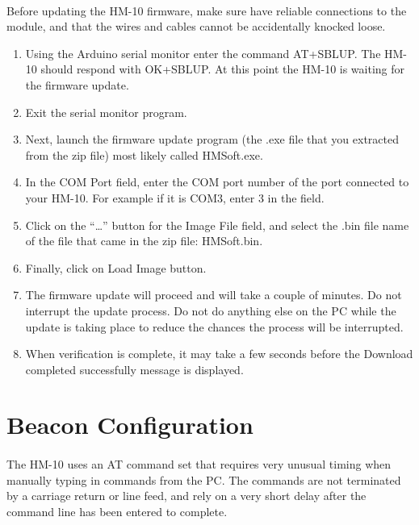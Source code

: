\documentclass[a4paper,12pt]{report}
\begin{document}
\paragraph{}Before updating the HM-10 firmware, make sure have reliable connections to the module, and that the wires and cables cannot be accidentally knocked loose.
\begin{enumerate}
	\item  Using the Arduino serial monitor enter the command AT+SBLUP. The HM-10 should respond with OK+SBLUP. At this point the HM-10 is waiting for the firmware update. 
	\item Exit the serial monitor program. 
	\item Next, launch the firmware update program (the .exe file that you extracted from the zip file) most likely called HMSoft.exe. 
	\item In the COM Port field, enter the COM port number of the port connected to your HM-10. For example if it is COM3, enter 3 in the field. 
	\item Click on the “…” button for the Image File field, and select the .bin file name of the file that came in the zip file: HMSoft.bin. 
	\item Finally, click on Load Image button. 
	\item The firmware update will proceed and will take a couple of minutes. Do not interrupt the update process. Do not do anything else on the PC while the update is taking place to reduce the chances the process will be interrupted.
	\item When verification is complete, it may take a few seconds before the Download completed successfully message is displayed. 
\end{enumerate}
\newpage
\section{Beacon Configuration}
\paragraph{}The HM-10 uses an AT command set that requires very unusual timing when manually typing in commands from the PC. The commands are not terminated by a carriage return or line feed, and rely on a very short delay after the command line has been entered to complete.
\end{document}
